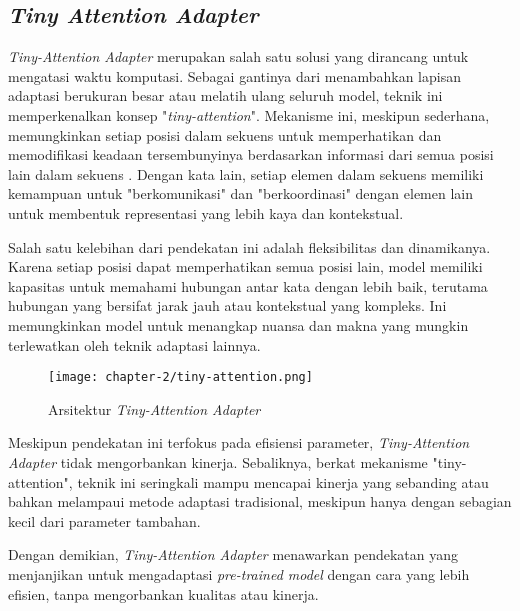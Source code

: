 \subsection{\textit{Tiny Attention Adapter}}

\textit{Tiny-Attention Adapter} merupakan salah satu solusi yang dirancang untuk mengatasi waktu komputasi. Sebagai gantinya dari menambahkan lapisan adaptasi berukuran besar atau melatih ulang seluruh model, teknik ini memperkenalkan konsep "\textit{tiny-attention}". Mekanisme ini, meskipun sederhana, memungkinkan setiap posisi dalam sekuens untuk memperhatikan dan memodifikasi keadaan tersembunyinya berdasarkan informasi dari semua posisi lain dalam sekuens \parencite{tinyattention}. Dengan kata lain, setiap elemen dalam sekuens memiliki kemampuan untuk "berkomunikasi" dan "berkoordinasi" dengan elemen lain untuk membentuk representasi yang lebih kaya dan kontekstual.

Salah satu kelebihan dari pendekatan ini adalah fleksibilitas dan dinamikanya. Karena setiap posisi dapat memperhatikan semua posisi lain, model memiliki kapasitas untuk memahami hubungan antar kata dengan lebih baik, terutama hubungan yang bersifat jarak jauh atau kontekstual yang kompleks. Ini memungkinkan model untuk menangkap nuansa dan makna yang mungkin terlewatkan oleh teknik adaptasi lainnya.

\begin{figure}[ht]
    \centering
    \texttt{[image: chapter-2/tiny-attention.png]}
    \caption{Arsitektur \textit{Tiny-Attention Adapter}}
    \label{fig:tiny-attention}
\end{figure}


Meskipun pendekatan ini terfokus pada efisiensi parameter, \textit{Tiny-Attention Adapter} tidak mengorbankan kinerja. Sebaliknya, berkat mekanisme "tiny-attention", teknik ini seringkali mampu mencapai kinerja yang sebanding atau bahkan melampaui metode adaptasi tradisional, meskipun hanya dengan sebagian kecil dari parameter tambahan.

Dengan demikian, \textit{Tiny-Attention Adapter} menawarkan pendekatan yang menjanjikan untuk mengadaptasi \textit{pre-trained model} dengan cara yang lebih efisien, tanpa mengorbankan kualitas atau kinerja.
